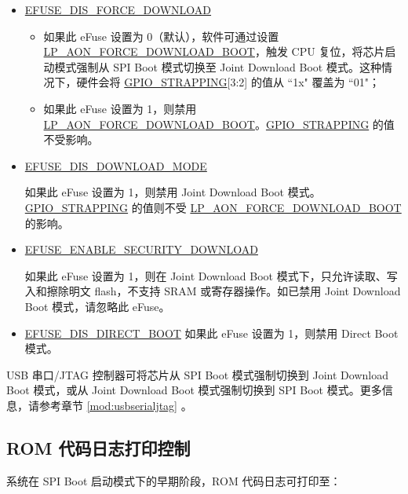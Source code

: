 \documentclass[main\_\_CN.tex]{subfiles}
\begin{document}
\begin{itemize}
    \item \hyperref[fielddesc:EFUSEDISFORCEDOWNLOAD]{EFUSE\_DIS\_FORCE\_DOWNLOAD}
    \begin{itemize}
    \item 如果此 eFuse 设置为 0（默认），软件可通过设置 \hyperref[fielddesc:LPAONFORCEDOWNLOADBOOT]{LP\_AON\_FORCE\_DOWNLOAD\_BOOT}，触发 CPU 复位，将芯片启动模式强制从 SPI Boot 模式切换至 Joint Download Boot 模式。这种情况下，硬件会将 \hyperref[fielddesc:GPIOSTRAPPING]{GPIO\_STRAPPING}[3:2] 的值从 ``1x" 覆盖为 ``01"；

    \item 如果此 eFuse 设置为 1，则禁用 \hyperref[fielddesc:LPAONFORCEDOWNLOADBOOT]{LP\_AON\_FORCE\_DOWNLOAD\_BOOT}。\hyperref[fielddesc:GPIOSTRAPPING]{GPIO\_STRAPPING} 的值不受影响。
    \end{itemize}

    \item \hyperref[fielddesc:EFUSEDISDOWNLOADMODE]{EFUSE\_DIS\_DOWNLOAD\_MODE}

    如果此 eFuse 设置为 1，则禁用 Joint Download Boot 模式。\hyperref[fielddesc:GPIOSTRAPPING]{GPIO\_STRAPPING} 的值则不受 \hyperref[fielddesc:LPAONFORCEDOWNLOADBOOT]{LP\_AON\_FORCE\_DOWNLOAD\_BOOT} 的影响。

    \item \hyperref[fielddesc:EFUSEENABLESECURITYDOWNLOAD]{EFUSE\_ENABLE\_SECURITY\_DOWNLOAD}

    如果此 eFuse 设置为 1，则在 Joint Download Boot 模式下，只允许读取、写入和擦除明文 flash，不支持 SRAM 或寄存器操作。如已禁用 Joint Download Boot 模式，请忽略此 eFuse。

    \item \hyperref[fielddesc:EFUSEDISDIRECTBOOT]{EFUSE\_DIS\_DIRECT\_BOOT}
    如果此 eFuse 设置为 1，则禁用 Direct Boot 模式。
\end{itemize}

USB 串口/JTAG 控制器可将芯片从 SPI Boot 模式强制切换到 Joint Download Boot 模式，或从 Joint Download Boot 模式强制切换到 SPI Boot 模式。更多信息，请参考章节 \ref{mod:usbserialjtag} \textit{}。

\subsection{ROM 代码日志打印控制}


系统在 SPI Boot 启动模式下的早期阶段，ROM 代码日志可打印至：
\end{document}
